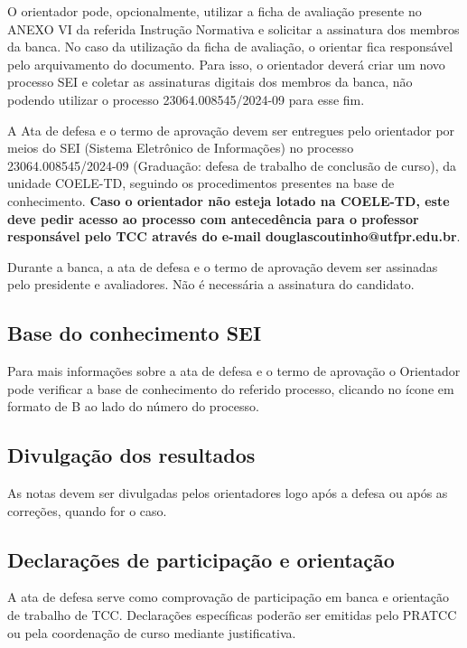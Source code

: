 \documentclass[a4paper, 12pt]{article}
\newcommand{\seiprocess}{23064.008545/2024-09} %
\begin{document}
	O orientador pode, opcionalmente, utilizar a ficha de avaliação presente no ANEXO VI da referida Instrução Normativa e solicitar a assinatura dos membros da banca. No caso da utilização da ficha de avaliação, o orientar fica responsável pelo arquivamento do documento. Para isso, o orientador deverá criar um novo processo SEI e coletar as assinaturas digitais dos membros da banca, não podendo utilizar o processo \seiprocess{} para esse fim.
 	
	A Ata de defesa e o termo de aprovação devem ser entregues pelo orientador por meios do SEI (Sistema Eletrônico de Informações) no processo \seiprocess{} (Graduação: defesa de trabalho de conclusão de curso), da unidade COELE-TD, seguindo os procedimentos presentes na base de conhecimento. \textbf{Caso o orientador não esteja lotado na COELE-TD, este deve pedir acesso ao processo com antecedência para o professor responsável pelo TCC através do e-mail douglascoutinho@utfpr.edu.br}.

	Durante a banca, a ata de defesa e o termo de aprovação devem ser assinadas pelo presidente e avaliadores. Não é necessária a assinatura do candidato. 
	
	\subsection{Base do conhecimento SEI}
	
	Para mais informações sobre a ata de defesa e o termo de aprovação o Orientador pode verificar a base de conhecimento do referido processo, clicando no ícone em formato de B ao lado do número do processo.
	
	\subsection{Divulgação dos resultados}
	
	As notas devem ser divulgadas pelos orientadores logo após a defesa ou após as correções, quando for o caso.

	\subsection{Declarações de participação e orientação}

	A ata de defesa serve como comprovação de participação em banca e orientação de trabalho de TCC. Declarações específicas poderão ser emitidas pelo PRATCC ou pela coordenação de curso mediante justificativa.
	
\end{document}
